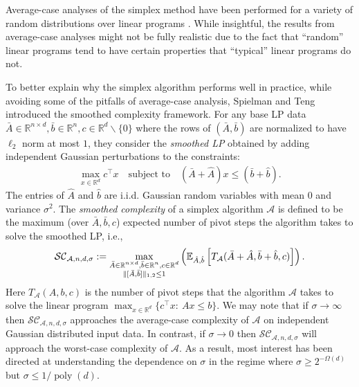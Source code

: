 \documentclass{article}\usepackage[a4paper,margin=20mm]{geometry}
\newcommand{\R}{\mathbb R}
\newcommand{\E}{\mathbb E}
\newcommand{\poly}{\operatorname{poly}}
\begin{document}
Average-case analyses of the simplex method have been performed for a variety of random distributions over linear programs
\cite{b82,b87,b99, jour/mapr/Smale83, report/Haimovich83, jour/mapr/Megiddo86, jour/jc/AKS87, jour/mapr/Todd86, jour/jacm/AM85}.
While insightful, the results from average-case analyses might not be fully realistic due to the fact that ``random''
linear programs tend to have certain properties that ``typical'' linear programs do not.

To better explain why the simplex algorithm performs well in practice, while avoiding some of the pitfalls
of average-case analysis, Spielman and Teng \cite{ST04} introduced the smoothed complexity framework. 
For any base LP
data $\bar{A} \in \R^{n\times d}, \bar{b}\in \R^n, c\in \R^d \backslash \{0\}$
where the rows of $(\bar A,\bar b)$ are normalized to have $\ell_2$ norm at most $1$, they consider
the \emph{smoothed LP} obtained by adding independent Gaussian perturbations to the
constraints:
\begin{align*}
    \max_{x\in \R^d} c^\top x \quad \text{subject to} \quad (\bar{A} + \hat{A}) x \leq (\bar{b} + \hat{b}).
\end{align*}
The entries of $\hat{A}$ and $\hat{b}$ are i.i.d. Gaussian random variables
with mean $0$ and variance $\sigma^2$. The \emph{smoothed complexity} of a simplex
algorithm $\mathcal{A}$ is defined to be the maximum (over $\bar A, \bar b, c$) expected
number of pivot steps the algorithm takes to solve the smoothed LP, i.e.,
\begin{align*}
    \mathcal{SC}_{\mathcal{A},n,d,\sigma} := \max_{\substack{\bar{A} \in \R^{n\times d}, \bar{b}\in \R^n, c\in \R^d \\ \|[\Bar{A},\Bar{b}]\|_{1, 2} \leq 1}} \left(\E_{\hat{A},\hat{b}}\left[ T_{\mathcal{A}}(\bar{A} + \hat{A}, \bar{b} + \hat{b}, c) \right] \right).
\end{align*}
Here $T_{\mathcal{A}}(A,b,c)$ is the number of pivot steps that the algorithm $\mathcal{A}$ takes to solve the linear program $\max_{x\in \R^d} \{c^\top x:  ~ A x \leq b\}$.
We may note that if $\sigma \to \infty$ then $\mathcal{SC}_{\mathcal A, n, d, \sigma}$
approaches the average-case complexity of $\mathcal{A}$ on independent Gaussian distributed input data.
In contrast, if $\sigma \to 0$ then $\mathcal{SC}_{\mathcal A, n, d, \sigma}$ will approach
the worst-case complexity of $\mathcal A$.
As a result, most interest has been directed at understanding the dependence on $\sigma$
in the regime where $\sigma \geq 2^{-\Omega(d)}$ but $\sigma \leq 1/\poly(d)$.
\end{document}
